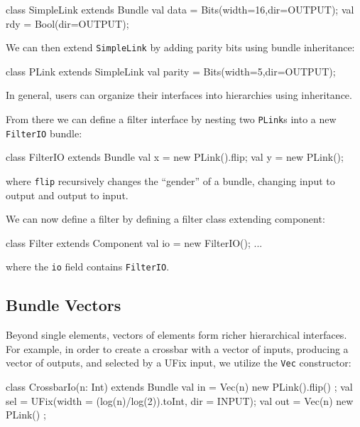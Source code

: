 \documentclass[10pt]{article}
\begin{document}
\begin{scala}
class SimpleLink extends Bundle { 
  val data = Bits(width=16,dir=OUTPUT); 
  val rdy  = Bool(dir=OUTPUT);
}
\end{scala}

\noindent
We can then extend \verb+SimpleLink+ by adding parity bits using
bundle inheritance:

\begin{scala}
class PLink extends SimpleLink { 
  val parity = Bits(width=5,dir=OUTPUT); 
}
\end{scala}

\noindent
In general, users can organize their interfaces into hierarchies using inheritance.  

From there we can define a filter interface by nesting two
\verb+PLink+s into a new \verb+FilterIO+ bundle:

\begin{scala}
class FilterIO extends Bundle { 
  val x = new PLink().flip;
  val y = new PLink();
}
\end{scala}

\noindent
where \verb+flip+ recursively changes the ``gender'' of a bundle,
changing input to output and output to input.

We can now define a filter by defining a filter class extending component:

\begin{scala}
class Filter extends Component { 
  val io = new FilterIO();
  ...
}
\end{scala}

\noindent 
where the \verb+io+ field contains \verb+FilterIO+. 

\subsection{Bundle Vectors}

Beyond single elements, vectors of elements form richer hierarchical interfaces.  
For example, in order to create a crossbar with a vector of inputs, producing a vector of outputs, and selected by a UFix input, 
we utilize the \verb+Vec+ constructor:

\begin{scala}
class CrossbarIo(n: Int) extends Bundle {
  val in  = Vec(n){ new PLink().flip() };
  val sel = UFix(width = (log(n)/log(2)).toInt, dir = INPUT);
  val out = Vec(n){ new PLink() };
}
\end{scala}

\end{document}
